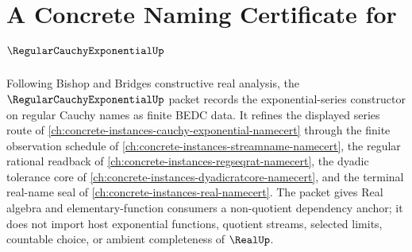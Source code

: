 \chapter{A Concrete Naming Certificate for $\RegularCauchyExponentialUp$}
\label{ch:concrete-instances-regular-cauchy-exponential-namecert}

Following Bishop and Bridges constructive real analysis, the $\RegularCauchyExponentialUp$ packet records the exponential-series constructor on regular Cauchy names as finite BEDC data. It refines the displayed series route of \autoref{ch:concrete-instances-cauchy-exponential-namecert} through the finite observation schedule of \autoref{ch:concrete-instances-streamname-namecert}, the regular rational readback of \autoref{ch:concrete-instances-regseqrat-namecert}, the dyadic tolerance core of \autoref{ch:concrete-instances-dyadicratcore-namecert}, and the terminal real-name seal of \autoref{ch:concrete-instances-real-namecert}. The packet gives Real algebra and elementary-function consumers a non-quotient dependency anchor; it does not import host exponential functions, quotient streams, selected limits, countable choice, or ambient completeness of $\RealUp$.

